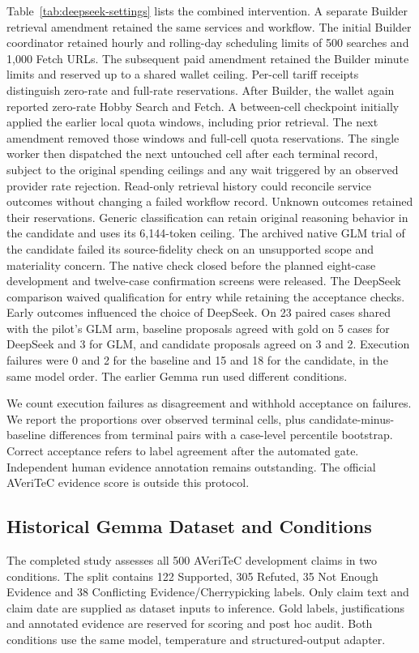\documentclass[conference]{IEEEtran}
\begin{document}
Table~\ref{tab:deepseek-settings} lists the combined intervention. A separate Builder retrieval amendment retained the same services and workflow. The initial Builder coordinator retained hourly and rolling-day scheduling limits of 500 searches and 1,000 Fetch URLs. The subsequent paid amendment retained the Builder minute limits and reserved up to a shared wallet ceiling. Per-cell tariff receipts distinguish zero-rate and full-rate reservations. After Builder, the wallet again reported zero-rate Hobby Search and Fetch. A between-cell checkpoint initially applied the earlier local quota windows, including prior retrieval. The next amendment removed those windows and full-cell quota reservations. The single worker then dispatched the next untouched cell after each terminal record, subject to the original spending ceilings and any wait triggered by an observed provider rate rejection. Read-only retrieval history could reconcile service outcomes without changing a failed workflow record. Unknown outcomes retained their reservations. Generic classification can retain original reasoning behavior in the candidate and uses its 6,144-token ceiling. The archived native GLM trial of the candidate failed its source-fidelity check on an unsupported scope and materiality concern. The native check closed before the planned eight-case development and twelve-case confirmation screens were released. The DeepSeek comparison waived qualification for entry while retaining the acceptance checks. Early outcomes influenced the choice of DeepSeek. On 23 paired cases shared with the pilot's GLM arm, baseline proposals agreed with gold on 5 cases for DeepSeek and 3 for GLM, and candidate proposals agreed on 3 and 2. Execution failures were 0 and 2 for the baseline and 15 and 18 for the candidate, in the same model order. The earlier Gemma run used different conditions.

We count execution failures as disagreement and withhold acceptance on failures. We report the proportions over observed terminal cells, plus candidate-minus-baseline differences from terminal pairs with a case-level percentile bootstrap. Correct acceptance refers to label agreement after the automated gate. Independent human evidence annotation remains outstanding. The official AVeriTeC evidence score is outside this protocol.

\subsection{Historical Gemma Dataset and Conditions}
The completed study assesses all 500 AVeriTeC development claims in two conditions. The split contains 122 Supported, 305 Refuted, 35 Not Enough Evidence and 38 Conflicting Evidence/Cherrypicking labels. Only claim text and claim date are supplied as dataset inputs to inference. Gold labels, justifications and annotated evidence are reserved for scoring and post hoc audit. Both conditions use the same model, temperature and structured-output adapter.
\end{document}
